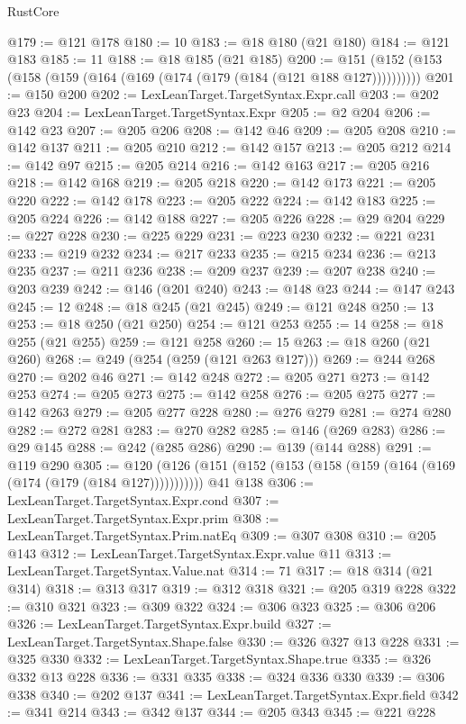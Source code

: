 \begin{lexlean}{RustCore}
\begin{coremodule}
@179 := @121 @178
@180 := 10
@183 := @18 @180 (@21 @180)
@184 := @121 @183
@185 := 11
@188 := @18 @185 (@21 @185)
@200 := @151 (@152 (@153 (@158 (@159 (@164 (@169 (@174 (@179 (@184 (@121 @188 @127))))))))))
@201 := @150 @200
@202 := LexLeanTarget.TargetSyntax.Expr.call
@203 := @202 @23
@204 := LexLeanTarget.TargetSyntax.Expr
@205 := @2 @204
@206 := @142 @23
@207 := @205 @206
@208 := @142 @46
@209 := @205 @208
@210 := @142 @137
@211 := @205 @210
@212 := @142 @157
@213 := @205 @212
@214 := @142 @97
@215 := @205 @214
@216 := @142 @163
@217 := @205 @216
@218 := @142 @168
@219 := @205 @218
@220 := @142 @173
@221 := @205 @220
@222 := @142 @178
@223 := @205 @222
@224 := @142 @183
@225 := @205 @224
@226 := @142 @188
@227 := @205 @226
@228 := @29 @204
@229 := @227 @228
@230 := @225 @229
@231 := @223 @230
@232 := @221 @231
@233 := @219 @232
@234 := @217 @233
@235 := @215 @234
@236 := @213 @235
@237 := @211 @236
@238 := @209 @237
@239 := @207 @238
@240 := @203 @239
@242 := @146 (@201 @240)
@243 := @148 @23
@244 := @147 @243
@245 := 12
@248 := @18 @245 (@21 @245)
@249 := @121 @248
@250 := 13
@253 := @18 @250 (@21 @250)
@254 := @121 @253
@255 := 14
@258 := @18 @255 (@21 @255)
@259 := @121 @258
@260 := 15
@263 := @18 @260 (@21 @260)
@268 := @249 (@254 (@259 (@121 @263 @127)))
@269 := @244 @268
@270 := @202 @46
@271 := @142 @248
@272 := @205 @271
@273 := @142 @253
@274 := @205 @273
@275 := @142 @258
@276 := @205 @275
@277 := @142 @263
@279 := @205 @277 @228
@280 := @276 @279
@281 := @274 @280
@282 := @272 @281
@283 := @270 @282
@285 := @146 (@269 @283)
@286 := @29 @145
@288 := @242 (@285 @286)
@290 := @139 (@144 @288)
@291 := @119 @290
@305 := @120
    (@126 (@151 (@152 (@153 (@158 (@159 (@164 (@169 (@174 (@179 (@184 @127)))))))))))
    @41
    @138
@306 := LexLeanTarget.TargetSyntax.Expr.cond
@307 := LexLeanTarget.TargetSyntax.Expr.prim
@308 := LexLeanTarget.TargetSyntax.Prim.natEq
@309 := @307 @308
@310 := @205 @143
@312 := LexLeanTarget.TargetSyntax.Expr.value @11
@313 := LexLeanTarget.TargetSyntax.Value.nat
@314 := 71
@317 := @18 @314 (@21 @314)
@318 := @313 @317
@319 := @312 @318
@321 := @205 @319 @228
@322 := @310 @321
@323 := @309 @322
@324 := @306 @323
@325 := @306 @206
@326 := LexLeanTarget.TargetSyntax.Expr.build
@327 := LexLeanTarget.TargetSyntax.Shape.false
@330 := @326 @327 @13 @228
@331 := @325 @330
@332 := LexLeanTarget.TargetSyntax.Shape.true
@335 := @326 @332 @13 @228
@336 := @331 @335
@338 := @324 @336 @330
@339 := @306 @338
@340 := @202 @137
@341 := LexLeanTarget.TargetSyntax.Expr.field
@342 := @341 @214
@343 := @342 @137
@344 := @205 @343
@345 := @221 @228

\end{coremodule}
\end{lexlean}
